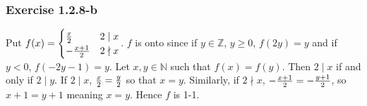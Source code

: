\documentclass{article}
\newcommand{\Z}{\mathbb{Z}}
\newcommand{\N}{\mathbb{N}}
\begin{document}
\subsubsection*{Exercise 1.2.8-b}

Put $f(x) = \begin{cases} {x \over 2} & 2 \mid x \\ - {x + 1 \over 2} & 2 \nmid x\end{cases}$. $f$ is onto since if $y \in \Z$, $y \geq 0$, $f(2y) = y$ and if $y < 0$, $f(-2y - 1) = y$.
Let $x, y \in \N$ such that $f(x) = f(y)$. Then $2 \mid x$ if and only if $2 \mid y$. If $2 \mid x$, ${x \over 2} = {y \over 2}$ so that $x = y$.
Similarly, if $2 \nmid x$, $- {x + 1 \over 2} = - {y + 1 \over 2}$, so $x + 1 = y + 1$ meaning $x = y$. Hence $f$ is 1-1.
\end{document}
